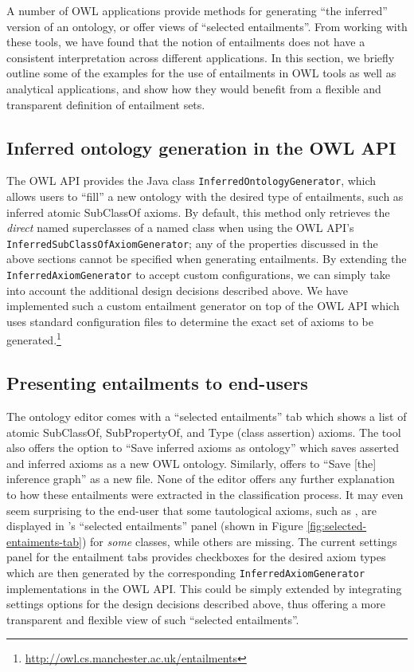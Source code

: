 A number of OWL applications provide methods for generating  \enquote{the inferred} version of an ontology, or offer views of \enquote{selected entailments}. From working with these tools, we have found that the notion of entailments does not have a consistent interpretation across different applications. In this section, we briefly outline some of the examples for the use of entailments in OWL tools as well as analytical applications, and show how they would benefit from a flexible and transparent definition of entailment sets.

\subsection{Inferred ontology generation in the OWL API}
The OWL API provides the Java class \texttt{InferredOntologyGenerator}, which allows users to \enquote{fill} a new ontology with the desired type of entailments, such as inferred atomic SubClassOf axioms. By default, this method only retrieves the \emph{direct} named superclasses of a named class when using the OWL API's \texttt{InferredSubClassOfAxiomGenerator}; any of the properties discussed in the above sections cannot be specified when generating entailments. By extending the \texttt{InferredAxiomGenerator} to accept custom configurations, we can simply take into account the additional design decisions described above. We have implemented such a custom entailment generator on top of the OWL API which uses standard configuration files to determine the exact set of axioms to be generated.\footnote{\url{http://owl.cs.manchester.ac.uk/entailments}}

\subsection{Presenting entailments to end-users}

The ontology editor \protege comes with a \enquote{selected entailments} tab which shows a list of atomic SubClassOf, SubPropertyOf, and Type (class assertion) axioms. The tool also offers the option to \enquote{Save inferred axioms as ontology} which saves asserted and inferred axioms as a new OWL ontology. Similarly, \tbc offers to \enquote{Save [the] inference graph} as a new file. None of the editor offers any further explanation to how these entailments were extracted in the classification process. It may even seem surprising to the end-user that some tautological axioms, such as , are displayed in \protege's \enquote{selected entailments} panel (shown in Figure \ref{fig:selected-entaiments-tab}) for \emph{some} classes, while others are missing. The current settings panel for the entailment tabs provides checkboxes for the desired axiom types which are then generated by the corresponding \texttt{InferredAxiomGenerator} implementations in the OWL API. This could be simply extended by integrating settings options for the design decisions described above, thus offering a more transparent and flexible view of such \enquote{selected entailments}.

